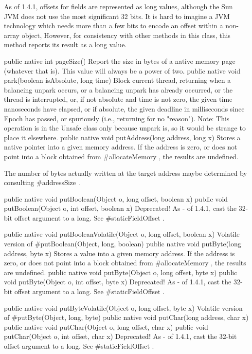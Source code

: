 As of 1.4.1, offsets for fields are represented as long values,
although the Sun JVM does not use the most significant 32 bits.
It is hard to imagine a JVM technology which needs more than
a few bits to encode an offset within a non-array object,
However, for consistency with other methods in this class,
this method reports its result as a long value.

 public native int pageSize()
Report the size in bytes of a native memory page (whatever that is).
This value will always be a power of two.
 public native  void park(boolean isAbsolute,
    long time)
Block current thread, returning when a balancing
unpark occurs, or a balancing unpark has
already occurred, or the thread is interrupted, or, if not
absolute and time is not zero, the given time nanoseconds have
elapsed, or if absolute, the given deadline in milliseconds
since Epoch has passed, or spuriously (i.e., returning for no
"reason"). Note: This operation is in the Unsafe class only
because unpark is, so it would be strange to place it
elsewhere.
 public native  void putAddress(long address,
    long x)
Stores a native pointer into a given memory address.  If the address is
zero, or does not point into a block obtained from #allocateMemory , the results are undefined.

 The number of bytes actually written at the target address maybe
determined by consulting #addressSize .

 public native  void putBoolean(Object o,
    long offset,
    boolean x)
 public  void putBoolean(Object o,
    int offset,
    boolean x) 
Deprecated! As - of 1.4.1, cast the 32-bit offset argument to a long. See #staticFieldOffset .

 public native  void putBooleanVolatile(Object o,
    long offset,
    boolean x)
Volatile version of #putBoolean(Object, long, boolean) 
 public native  void putByte(long address,
    byte x)
Stores a value into a given memory address.  If the address is zero, or
does not point into a block obtained from #allocateMemory , the
results are undefined.
 public native  void putByte(Object o,
    long offset,
    byte x)
 public  void putByte(Object o,
    int offset,
    byte x) 
Deprecated! As - of 1.4.1, cast the 32-bit offset argument to a long. See #staticFieldOffset .

 public native  void putByteVolatile(Object o,
    long offset,
    byte x)
Volatile version of #putByte(Object, long, byte) 
 public native  void putChar(long address,
    char x)
 public native  void putChar(Object o,
    long offset,
    char x)
 public  void putChar(Object o,
    int offset,
    char x) 
Deprecated! As - of 1.4.1, cast the 32-bit offset argument to a long. See #staticFieldOffset .

